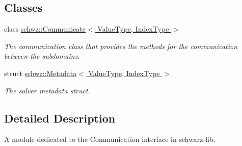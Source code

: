 \subsection*{Classes}
\begin{DoxyCompactItemize}
\item 
class \hyperlink{classschwz_1_1Communicate}{schwz\+::\+Communicate$<$ Value\+Type, Index\+Type $>$}
\begin{DoxyCompactList}\small\item\em The communication class that provides the methods for the communication between the subdomains. \end{DoxyCompactList}\item 
struct \hyperlink{structschwz_1_1Metadata}{schwz\+::\+Metadata$<$ Value\+Type, Index\+Type $>$}
\begin{DoxyCompactList}\small\item\em The solver metadata struct. \end{DoxyCompactList}\end{DoxyCompactItemize}


\subsection{Detailed Description}
A module dedicated to the Communication interface in schwarz-\/lib. 

